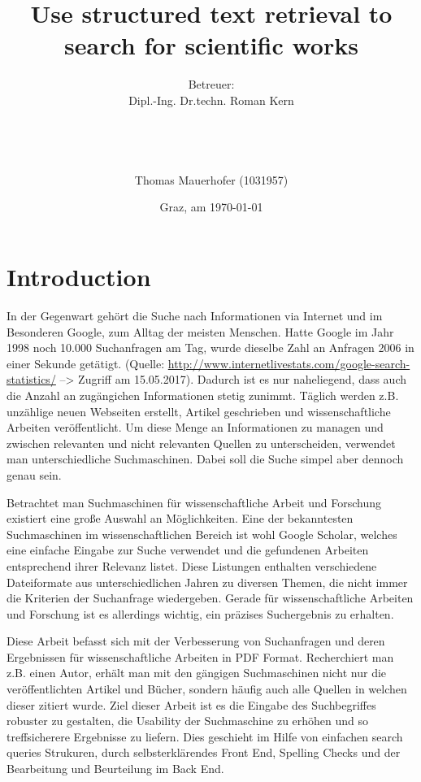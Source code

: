 \documentclass[a4paper, 12pt]{scrartcl}
\title{Use structured text retrieval to search for scientific works}
\author{Betreuer: \\
Dipl.-Ing. Dr.techn. Roman Kern \\ \\ \\ \\ \\
Thomas Mauerhofer (1031957)}
\date{Graz, am \today{}}
\begin{document}
 \maketitle
 
\newpage

\tableofcontents

\newpage

\section{Introduction}
\label{sec:Introduction}

In der Gegenwart gehört die Suche nach Informationen via Internet und im Besonderen Google, zum Alltag der meisten Menschen. Hatte Google im Jahr 1998 noch 10.000 Suchanfragen am Tag, wurde dieselbe Zahl 
an Anfragen 2006 in einer Sekunde getätigt. (Quelle: \url{http://www.internetlivestats.com/google-search-statistics/} --> Zugriff am 15.05.2017). Dadurch ist es nur naheliegend, dass auch die Anzahl an zugängichen
Informationen stetig zunimmt. Täglich werden z.B. unzählige neuen Webseiten erstellt, Artikel geschrieben und wissenschaftliche Arbeiten veröffentlicht. Um
diese Menge an Informationen zu managen und zwischen relevanten und nicht relevanten Quellen zu unterscheiden, verwendet man unterschiedliche Suchmaschinen. 
Dabei soll die Suche simpel aber dennoch genau sein.

Betrachtet man Suchmaschinen für wissenschaftliche Arbeit und Forschung existiert eine große Auswahl an Möglichkeiten. Eine der bekanntesten Suchmaschinen im wissenschaftlichen Bereich ist wohl Google
Scholar, welches eine einfache Eingabe zur Suche verwendet und die gefundenen Arbeiten entsprechend ihrer Relevanz listet. Diese Listungen enthalten verschiedene Dateiformate aus unterschiedlichen Jahren zu 
diversen Themen, die nicht immer die Kriterien der Suchanfrage wiedergeben. Gerade für wissenschaftliche Arbeiten und Forschung ist es allerdings wichtig, ein präzises Suchergebnis zu erhalten. 

Diese Arbeit befasst sich mit der Verbesserung von Suchanfragen und deren Ergebnissen für wissenschaftliche Arbeiten in PDF Format. Recherchiert man z.B. einen Autor, erhält man mit den gängigen Suchmaschinen
nicht nur die veröffentlichten Artikel und Bücher, sondern häufig auch alle Quellen in welchen dieser zitiert wurde. Ziel dieser Arbeit ist es die Eingabe des Suchbegriffes robuster zu gestalten, die 
Usability der Suchmaschine zu erhöhen und so treffsicherere Ergebnisse zu liefern. Dies geschieht im Hilfe von einfachen search queries Strukuren, durch selbsterklärendes Front End, Spelling Checks und 
der Bearbeitung und Beurteilung im Back End. 
\end{document}
